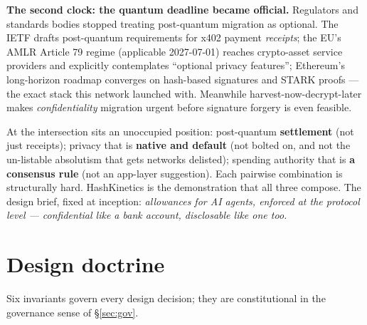 \documentclass[11pt]{article}
\begin{document}
\textbf{The second clock: the quantum deadline became official.} Regulators and standards bodies stopped treating post-quantum migration as optional. The IETF drafts post-quantum requirements for x402 payment \emph{receipts}; the EU's AMLR Article 79 regime (applicable 2027-07-01) reaches crypto-asset service providers and explicitly contemplates ``optional privacy features''; Ethereum's long-horizon roadmap converges on hash-based signatures and STARK proofs --- the exact stack this network launched with. Meanwhile harvest-now-decrypt-later makes \emph{confidentiality} migration urgent before signature forgery is even feasible.

At the intersection sits an unoccupied position: post-quantum \textbf{settlement} (not just receipts); privacy that is \textbf{native and default} (not bolted on, and not the un-listable absolutism that gets networks delisted); spending authority that is \textbf{a consensus rule} (not an app-layer suggestion). Each pairwise combination is structurally hard. HashKinetics is the demonstration that all three compose. The design brief, fixed at inception: \emph{allowances for AI agents, enforced at the protocol level --- confidential like a bank account, disclosable like one too.}

\section{Design doctrine}\label{sec:doctrine}
Six invariants govern every design decision; they are constitutional in the governance sense of \S\ref{sec:gov}.
\end{document}
